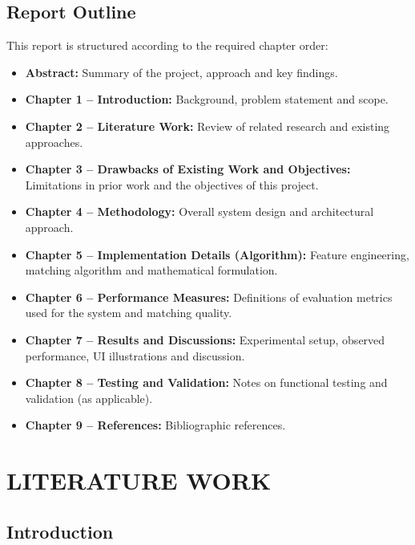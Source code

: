 \documentclass[12pt,a4paper]{report}
\let\origsection\section
\renewcommand{\section}{\needspace{4\baselineskip}\origsection}
\begin{document}
\section{Report Outline}

This report is structured according to the required chapter order:

\begin{itemize}[noitemsep]
    \item \textbf{Abstract:} Summary of the project, approach and key findings.
    \item \textbf{Chapter 1 -- Introduction:} Background, problem statement and scope.
    \item \textbf{Chapter 2 -- Literature Work:} Review of related research and existing approaches.
    \item \textbf{Chapter 3 -- Drawbacks of Existing Work and Objectives:} Limitations in prior work and the objectives of this project.
    \item \textbf{Chapter 4 -- Methodology:} Overall system design and architectural approach.
    \item \textbf{Chapter 5 -- Implementation Details (Algorithm):} Feature engineering, matching algorithm and mathematical formulation.
    \item \textbf{Chapter 6 -- Performance Measures:} Definitions of evaluation metrics used for the system and matching quality.
    \item \textbf{Chapter 7 -- Results and Discussions:} Experimental setup, observed performance, UI illustrations and discussion.
    \item \textbf{Chapter 8 -- Testing and Validation:} Notes on functional testing and validation (as applicable).
    \item \textbf{Chapter 9 -- References:} Bibliographic references.
\end{itemize}


\chapter{LITERATURE WORK}
\thispagestyle{fancy}

\section{Introduction}
\end{document}
